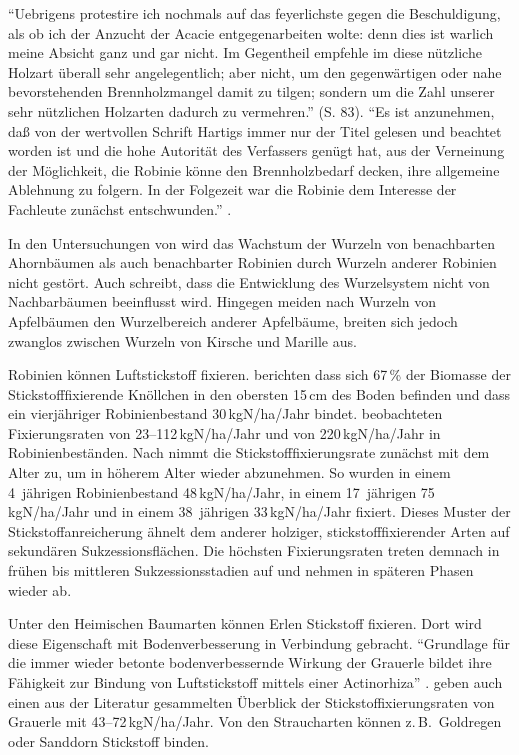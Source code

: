 \documentclass[twocolumn]{scrartcl}
\begin{document}
\enquote{Uebrigens protestire ich nochmals auf das feyerlichste gegen
  die Beschuldigung, als ob ich der Anzucht der Acacie
  entgegenarbeiten wolte: denn dies ist warlich meine Absicht ganz und
  gar nicht. Im Gegentheil empfehle im diese nützliche Holzart
  überall sehr angelegentlich; aber nicht, um den gegenwärtigen oder
  nahe bevorstehenden Brennholzmangel damit zu tilgen; sondern um die
  Zahl unserer sehr nützlichen Holzarten dadurch zu vermehren.}
(S. 83).
\enquote{Es ist anzunehmen, daß von der wertvollen Schrift Hartigs
  immer nur der Titel gelesen und beachtet worden ist und die hohe
  Autorität des Verfassers genügt hat, aus der Verneinung der
  Möglichkeit, die Robinie könne den Brennholzbedarf decken, ihre
  allgemeine Ablehnung zu folgern. In der Folgezeit war die Robinie
  dem Interesse der Fachleute zunächst entschwunden.}
\citep{erteld1952robinieErtrag}.

In den Untersuchungen von
\citet[S.~150--160]{scamoni1952robinieWurzeln} wird das Wachstum der
Wurzeln von benachbarten Ahornbäumen als auch benachbarter Robinien
durch Wurzeln anderer Robinien nicht gestört.
Auch \citet{bencat1992robinie} schreibt, dass die Entwicklung des
Wurzelsystem nicht von Nachbarbäumen beeinflusst wird.
Hingegen meiden nach
\citet[S.~53]{kolesnikov1971wurzeln} Wurzeln von Apfelbäumen den
Wurzelbereich anderer Apfelbäume, breiten sich jedoch zwanglos
zwischen Wurzeln von Kirsche und Marille aus.

Robinien können Luftstickstoff fixieren.
\citet{boring1984robinieN} berichten dass sich 67\,\% der Biomasse der
Stickstofffixierende Knöllchen in den obersten 15\,cm des Boden befinden
und dass ein vierjähriger Robinienbestand 30\,kgN/ha/Jahr bindet.
\citet{noh2009robinieN} beobachteten
Fixierungsraten von 23--112\,kgN/ha/Jahr und \citet{danso1995robinieN}
von 220\,kgN/ha/Jahr in Robinienbeständen.
Nach \citet{boring1984robinie} nimmt die Stickstofffixierungsrate
zunächst mit dem Alter zu, um in höherem Alter wieder abzunehmen. So
wurden in einem 4~jährigen Robinienbestand 48\,kgN/ha/Jahr, in einem
17~jährigen 75\,kgN/ha/Jahr und in einem 38~jährigen 33\,kgN/ha/Jahr
fixiert. Dieses Muster der Stickstoffanreicherung ähnelt dem anderer
holziger, stickstofffixierender Arten auf sekundären Sukzessionsflächen.
Die höchsten Fixierungsraten treten demnach in frühen bis mittleren
Sukzessionsstadien auf und nehmen in späteren Phasen wieder ab.

Unter den Heimischen Baumarten können Erlen Stickstoff fixieren. Dort
wird diese Eigenschaft mit Bodenverbesserung in Verbindung
gebracht. \enquote{Grundlage für die immer wieder betonte bodenverbessernde
Wirkung der Grauerle bildet ihre Fähigkeit zur Bindung von
Luftstickstoff mittels einer Actinorhiza}
\citep{schuett2014alnusIncarna}. \citet{schuett2014alnusIncarna} geben
auch einen aus der Literatur gesammelten Überblick der
Stickstoffixierungsraten von Grauerle mit 43--72\,kgN/ha/Jahr.
Von den Straucharten können z.\,B.\ Goldregen oder Sanddorn Stickstoff binden.
\end{document}
